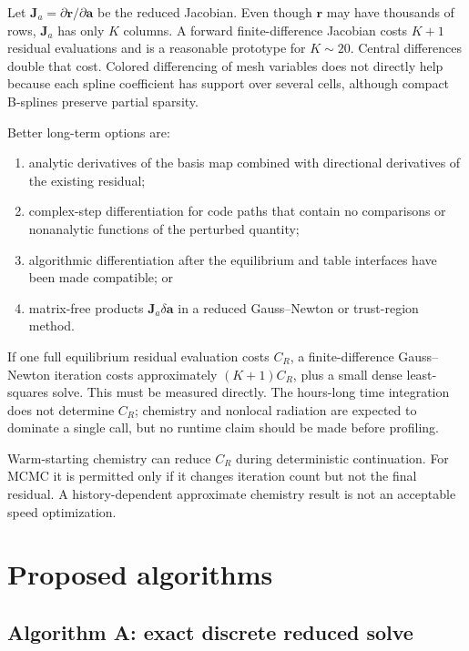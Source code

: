 \documentclass[english,a4paper]{my_memo}
\newcommand{\vect}[1]{\mathbf{#1}}
\newcommand{\coef}{\vect{a}}
\begin{document}
Let \(\vect{J}_a=\partial\vect{r}/\partial\coef\) be the reduced Jacobian.
Even though \(\vect{r}\) may have thousands of rows, \(\vect{J}_a\) has only
\(K\) columns.  A forward finite-difference Jacobian costs \(K+1\) residual
evaluations and is a reasonable prototype for \(K\sim20\).  Central
differences double that cost.  Colored differencing of mesh variables does not
directly help because each spline coefficient has support over several cells,
although compact B-splines preserve partial sparsity.

Better long-term options are:
\begin{enumerate}
\item analytic derivatives of the basis map combined with directional
  derivatives of the existing residual;
\item complex-step differentiation for code paths that contain no comparisons
  or nonanalytic functions of the perturbed quantity;
\item algorithmic differentiation after the equilibrium and table interfaces
  have been made compatible; or
\item matrix-free products \(\vect{J}_a\delta\coef\) in a reduced
  Gauss--Newton or trust-region method.
\end{enumerate}

If one full equilibrium residual evaluation costs \(C_R\), a finite-difference
Gauss--Newton iteration costs approximately \((K+1)C_R\), plus a small dense
least-squares solve.  This must be measured directly.  The hours-long time
integration does not determine \(C_R\); chemistry and nonlocal radiation are
expected to dominate a single call, but no runtime claim should be made before
profiling.

Warm-starting chemistry can reduce \(C_R\) during deterministic continuation.
For MCMC it is permitted only if it changes iteration count but not the final
residual.  A history-dependent approximate chemistry result is not an acceptable
speed optimization.

\section{Proposed algorithms}\label{sec:algorithms}

\subsection{Algorithm A: exact discrete reduced solve}
\end{document}
